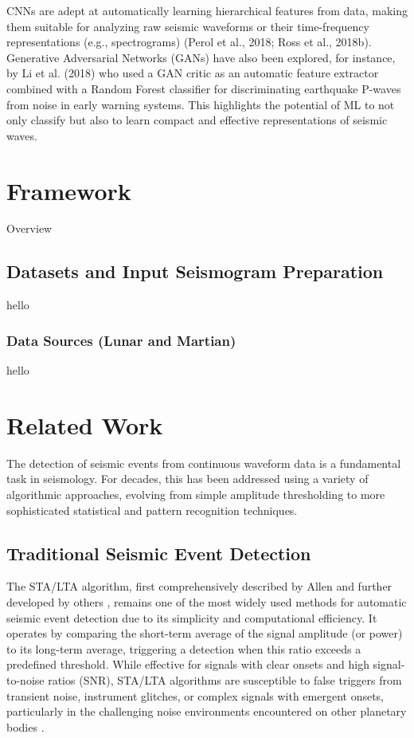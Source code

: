 \documentclass[conference]{IEEEtran}
\begin{document}
        CNNs are adept at automatically learning hierarchical features from data, making them suitable for analyzing raw
        seismic waveforms or their time-frequency representations (e.g., spectrograms) (Perol et al., 2018; Ross et al.,
        2018b). Generative Adversarial Networks (GANs) have also been explored, for instance, by Li et al. (2018) who
        used a GAN critic as an automatic feature extractor combined with a Random Forest classifier for discriminating
        earthquake P-waves from noise in early warning systems. This highlights the potential of ML to not only classify
        but also to learn compact and effective representations of seismic waves.

\section{Framework}
    Overview
    \subsection{Datasets and Input Seismogram Preparation}
    hello
        \subsubsection{Data Sources (Lunar and Martian)}
            hello
    


\section{Related Work}
\label{sec:related_work}
The detection of seismic events from continuous waveform data is a fundamental task in seismology. For decades, this has been addressed using a variety of algorithmic approaches, evolving from simple amplitude thresholding to more sophisticated statistical and pattern recognition techniques.

\subsection{Traditional Seismic Event Detection}
The STA/LTA algorithm, first comprehensively described by Allen \cite{b14} and further developed by others \cite{b26}, remains one of the most widely used methods for automatic seismic event detection due to its simplicity and computational efficiency. It operates by comparing the short-term average of the signal amplitude (or power) to its long-term average, triggering a detection when this ratio exceeds a predefined threshold. While effective for signals with clear onsets and high signal-to-noise ratios (SNR), STA/LTA algorithms are susceptible to false triggers from transient noise, instrument glitches, or complex signals with emergent onsets, particularly in the challenging noise environments encountered on other planetary bodies \cite{b15}.
\end{document}

